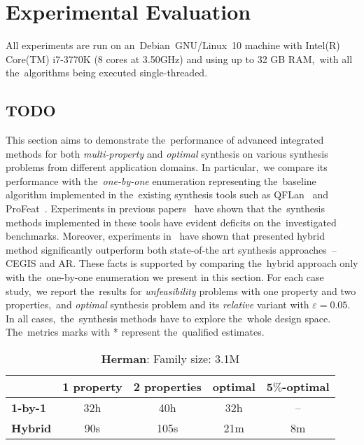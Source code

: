\chapter{Experimental Evaluation}\label{chap:experiments}

All experiments are run on an~Debian~GNU/Linux~10 machine with Intel(R) Core(TM) i7-3770K (8 cores at 3.50GHz) and using up to 32 GB RAM,~with all the~algorithms being executed single-threaded.

\section{TODO}
This section aims to demonstrate the~performance of advanced integrated methods for both \textit{multi-property} and \textit{optimal} synthesis on various synthesis problems from different application domains.
In particular,~we compare its performance with the~\emph{one-by-one} enumeration representing the~baseline algorithm implemented in the~existing synthesis tools such as QFLan~\cite{qflan} and ProFeat~\cite{profeat}.
Experiments in previous papers~\cite{cegar,cegis} have shown that the~synthesis methods implemented in these tools have evident deficits on the~investigated benchmarks.
Moreover, experiments in~\cite{roman-DP} have shown that presented hybrid method significantly outperform both state-of-the art synthesis approaches \,--\, CEGIS and AR.
These facts is supported by comparing the~hybrid approach only with the~one-by-one enumeration we present in this section.
For each case study,~we report the~results for \textit{unfeasibility} problems with one property and two properties,~and \textit{optimal} synthesis problem and its \textit{relative} variant with $\varepsilon = 0.05$.
In all cases,~the~synthesis methods have to explore the~whole design space.
The~metrics marks with * represent the~qualified estimates.

    
\begin{table}[ht!]
\centering
\begin{tabular}{l|cccc}
    \hline \hline 
    & \multicolumn{1}{l}{\textbf{1 property}} & \multicolumn{1}{l}{\textbf{2 properties}} & \multicolumn{1}{l}{\textbf{optimal}} & \multicolumn{1}{l}{\textbf{$\mathbf{5\%}$-optimal}} \\ \hline
    \textbf{1-by-1} & 32h & 40h & 32h & \,--\, \\
    \textbf{Hybrid} & 90s & 105s & 21m & 8m \\ \hline \hline
\end{tabular}
\caption{\textbf{Herman}: Family size: 3.1M}
\end{table}

